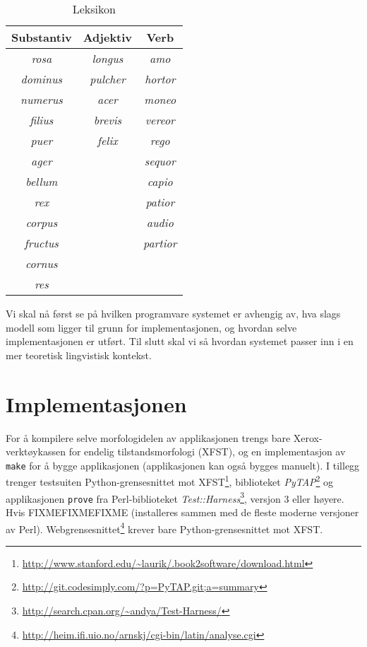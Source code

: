 \documentclass{article}
\newcommand\note[1]{\marginpar{\raggedright\tiny#1}}
\newcommand\link[1]{\href{#1}{#1}}
\let\lib\emph
\let\prog\texttt
\let\w\emph
\begin{document}
\begin{table}
\begin{center}
\begin{tabular}{|ccc|}
    \hline
Substantiv  & Adjektiv    & Verb \\
    \hline
\w{rosa}    & \w{longus}  & \w{amo}     \\
\w{dominus} & \w{pulcher} & \w{hortor}  \\
\w{numerus} & \w{acer}    & \w{moneo}   \\
\w{filius}  & \w{brevis}  & \w{vereor}  \\
\w{puer}    & \w{felix}   & \w{rego}    \\
\w{ager}    &             & \w{sequor}  \\
\w{bellum}  &             & \w{capio}   \\
\w{rex}     &             & \w{patior}  \\
\w{corpus}  &             & \w{audio}   \\
\w{fructus} &             & \w{partior} \\
\w{cornus}  &             &             \\
\w{res}     &             &             \\
    \hline
\end{tabular}
\end{center}
\caption{Leksikon}
\label{leksikon}
\end{table}

Vi skal n\aa{} f\o{}rst se p\aa{} hvilken programvare systemet er avhengig av,
hva slags modell som ligger til grunn for implementasjonen, og hvordan selve
implementasjonen er utf\o{}rt. Til slutt skal vi s\aa{} hvordan systemet
passer inn i en mer teoretisk lingvistisk kontekst.

\section{Implementasjonen}
For \aa{} kompilere selve morfologidelen av applikasjonen trengs bare
Xerox-verkt\o{}y\-kassen for endelig tilstandsmorfologi (XFST), og en
implementasjon av \prog{make} for \aa{} bygge applikasjonen (applikasjonen kan
ogs\aa{} bygges manuelt). I tillegg trenger testsuiten Python-grensesnittet mot
XFST\footnote{\href{http://www.stanford.edu/~laurik/.book2software/download.html}
{http://www.stanford.edu/\~{}laurik/.book2software/download.html}}, biblioteket
\lib{PyTAP}\footnote{\link{http://git.codesimply.com/?p=PyTAP.git;a=summary}}
og applikasjonen \prog{prove} fra Perl-biblioteket
\lib{Test::Harness}\footnote{\href{http://search.cpan.org/~andya/Test-Harness/}
{http://search.cpan.org/\~{}andya/Test-Harness/}},
versjon 3 eller h\o{}yere. Hvis FIXMEFIXMEFIXME
(installeres sammen med de fleste moderne versjoner av Perl\note{Sjekke at
dette stemmer.}).
Webgrensesnittet\footnote{\link{http://heim.ifi.uio.no/arnskj/cgi-bin/latin/analyse.cgi}}
krever bare Python-grensesnittet mot XFST.
\end{document}
